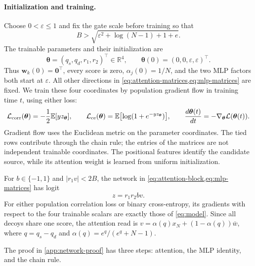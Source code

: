 \paragraph{Initialization and training.}
Choose $0<\varepsilon\le1$ and fix the gate scale before training so that
\begin{equation}
 B>\sqrt{\varepsilon^2+\log(N-1)+1+e}.
 \label{eq:gate-bound}
\end{equation}
The trainable parameters and their initialization are
\begin{equation}
 \bm\theta=(q_s,q_d,r_1,r_2)^\top\in\mathbb R^4,\qquad
 \bm\theta(0)=(0,0,\varepsilon,\varepsilon)^\top.
 \label{eq:initialization}
\end{equation}
Thus $\bm w_k(0)=\bm0^\top$, every score is zero, $\alpha_j(0)=1/N$,
and the two MLP factors both start at $\varepsilon$.
All other directions in \cref{eq:attention-matrices,eq:mlp-matrices} are fixed.
We train these four coordinates by population gradient flow in training time $t$, using either loss:
\begin{equation}
 \mathcal L_{\mathrm{corr}}(\bm\theta)=-\frac{1}{2}\mathbb E[y z_{\bm\theta}],\qquad
 \mathcal L_{\mathrm{ce}}(\bm\theta)=\mathbb E\bigl[\log(1+e^{-y z_{\bm\theta}})\bigr],\qquad
 \frac{d\bm\theta(t)}{dt}=-\nabla_{\bm\theta}\mathcal L(\bm\theta(t)).
 \label{eq:parameter-flow}
\end{equation}
Gradient flow uses the Euclidean metric on the parameter coordinates.
The tied rows contribute through the chain rule; the entries of the matrices are not independent trainable coordinates.
The positional features identify the candidate source, while its attention weight is learned from uniform initialization.

\begin{proposition}
\label{prop:realization}
For $b\in\{-1,1\}$ and $|r_1v|<2B$, the network in \cref{eq:attention-block,eq:mlp-matrices} has logit
\begin{equation}
 z=r_1r_2b v.
 \label{eq:model}
\end{equation}
For either population correlation loss or binary cross-entropy, its gradients with respect to the four trainable scalars
are exactly those of \cref{eq:model}. Since all decoys share one score, the attention read is
$v=\alpha(q)x_N+(1-\alpha(q))\bar w$, where
$q=q_s-q_d$ and $\alpha(q)=e^q/(e^q+N-1)$.
\end{proposition}
The proof in \cref{app:network-proof} has three steps: attention, the MLP identity, and the chain rule.


